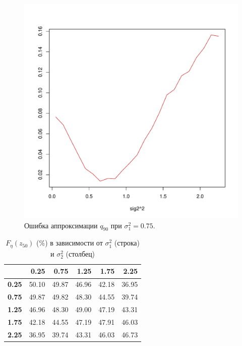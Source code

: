 \documentclass[12pt]{article}
\begin{document}
\begin{figure}[!hhh]
	\begin{center}
		\begin{minipage}[h]{0.8\linewidth}
			\includegraphics[width=1\linewidth]{img/gr_neww_3.pdf}
			\caption{Ошибка аппроксимации $q_{90}$ при $\sigma_{1}^{2} = 0.75$.} %
			\label{ris9} %
		\end{minipage}	
	\end{center}
\end{figure}
	
	
	\begin{table}[!hhh]
		\centering
		\caption{$F_{\eta}(z_{50})$ ($\%$) в зависимости от $\sigma_{1}^{2}$ (строка) и $\sigma_{2}^{2}$ (столбец) }
		\label{tab4}
		\begin{tabular}{rrrrrr}
			\hline
			& \textbf{0.25} & \textbf{0.75} & \textbf{1.25} & \textbf{1.75} & \textbf{2.25} \\ 
			\hline
			\textbf{0.25} & 50.10 & 49.87 & 46.96 & 42.18 & 36.95 \\ 
			\textbf{0.75} & 49.87 & 49.82 & 48.30 & 44.55 & 39.74 \\ 
			\textbf{1.25} & 46.96 & 48.30 & 49.00 & 47.19 & 43.31 \\ 
			\textbf{1.75} & 42.18 & 44.55 & 47.19 & 47.91 & 46.03 \\ 
			\textbf{2.25} & 36.95 & 39.74 & 43.31 & 46.03 & 46.73 \\ 
			\hline
		\end{tabular}
	\end{table}
\end{document}
